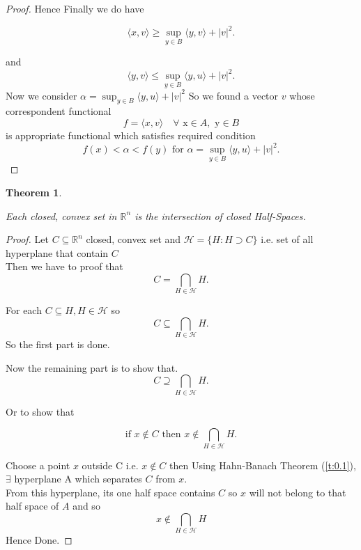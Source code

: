 \documentclass[oneside]{book}
\newtheorem{theorem}{Theorem}[section]
\begin{document}
\begin{proof}
		Hence Finally we do have 
		
		\begin{equation}
			\label{eq4.2}
			\langle x, v \rangle \geqslant\sup_{y\in B}\langle y, v\rangle+|v|^{2}.
		\end{equation}
		
		
		and 
		\begin{equation}
			\langle y, v\rangle  \leqslant \sup _{y \in B}\langle y, u\rangle + |v|^{2}.
		\end{equation}
		Now we consider  $\alpha =  \sup _{y \in B}\langle y, u\rangle + |v|^{2}$ 
		So we found a vector $v$ whose \\
		correspondent functional 
		\\ $$f = \langle x, v\rangle \quad  
		\forall \text{ x} \in A, \text{ y} \in B $$ is 
		appropriate functional which satisfies required condition 
		$$f(x)< \alpha < f(y)
		\text{ for } 
		\alpha =  \sup _{y \in B}\langle y, u\rangle + |v|^{2}.$$
	\end{proof}
	
	
	
	
	
	
	\begin{theorem}
		\label{t:0.2}
		
		Each closed, convex set in  $\mathbb{R}^{n}$ is the intersection of closed Half-Spaces.
		
	\end{theorem}
	
	
	
	
	
	\begin{proof}
		
		
		
		
		
		Let 
		$ C\subseteq \mathbb{R}^{n}$ closed, convex set and $\mathcal{H}=\{H: H\supset C\}$ i.e. set of all hyperplane that contain $C$ \\
		Then we have to proof that
		$$ C = \bigcap_{H \in \mathcal{H}} H. $$
		
		
		For each $ C \subseteq  H, H \in \mathcal{H}$ so 
		$$ C \subseteq \bigcap_{ H \in \mathcal{H}} H. $$
		So the first part is done.
		\hfill \break
		
		Now the remaining part is to show that.
		$$ C \supseteq \bigcap_{ H \in \mathcal{H}} H. $$
		
		
		Or to show that 
		
		$$\text{if }  x \notin C \text { then } x \notin \bigcap_{H \in \mathcal{H}} H. $$
		
		
		
		Choose a point $x$ outside C  i.e. $x \notin C$
		then Using Hahn-Banach Theorem (\ref{t:0.1}), $\exists$ hyperplane A which separates $C$ from $x$.\\
		From this hyperplane, its one half space contains $C$ so $x$ will not belong to that half space of $A$ and so 
		$$ x \notin \bigcap_{H \in \mathcal{H}} H $$
		Hence Done.
		
	\end{proof}
	
\end{document}
